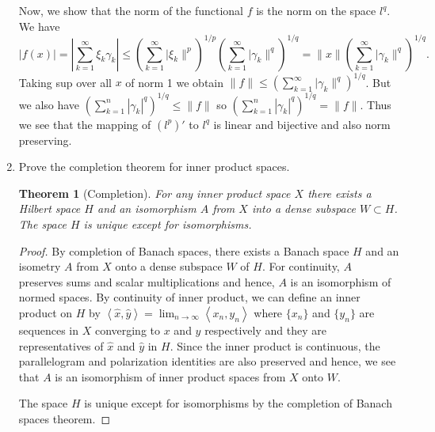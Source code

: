\documentclass[12pt]{article}
\newtheorem{thm}[]{Theorem}
\newcommand{\inn}[2]{\left\langle #1, #2 \right\rangle}
\begin{document}
\begin{enumerate}
\begin{mybox}
    \vspace*{3mm}
    Now, we show that the norm of the functional $f$ is
    the norm on the space $l^q$. We have
    $$|f(x)|=\left|\sum_{k=1}^\infty{\xi_k\gamma_k}
    \right|\leq\left(\sum_{k=1}^\infty{|\xi_k\|^p}
    \right)^{1/p}\left(\sum_{k=1}^\infty{|\gamma_k\|^q}
    \right)^{1/q}=\|x\|\left(\sum_{k=1}^\infty
    {|\gamma_k\|^q}\right)^{1/q}.$$
    Taking sup over all $x$ of norm 1 we obtain $\|f\|
    \leq \left(\sum_{k=1}^\infty
    {|\gamma_k\|^q}\right)^{1/q}$. But we also have 
    $\left(\sum_{k=1}^n{|\gamma_k|^q}\right)^{1/q}
    \leq\|f\|$ so $\left(\sum_{k=1}^n
    {|\gamma_k|^q}\right)^{1/q}=\|f\|$. Thus we see that
    the mapping of $(l^p)'$ to $l^q$ is linear and
    bijective and also norm preserving.
\end{mybox}


\item Prove the completion theorem for inner
product spaces.
\begin{mybox}

    \begin{thm}[Completion]
        For any inner product space $X$ there exists a
        Hilbert space
        $H$ and an isomorphism $A$ from $X$ into a dense
        subspace $W\subset H$. The space $H$
        is unique except for isomorphisms.

    \end{thm}
    \begin{proof}
        By completion of Banach spaces, there exists
        a Banach space $H$ and an isometry $A$ from $X$
        onto a dense subspace $W$ of $H$. For continuity,
        $A$ preserves sums and scalar multiplications and
        hence, $A$ is an isomorphism of normed spaces.
        By continuity of inner product, we can define
        an inner product on $H$ by
        $\inn{\hat{x}}{\hat{y}}=\lim_{n\to\infty}
        {\inn{x_n}{y_n}}$ where $\{x_n\}$ and $\{y_n\}$
        are sequences in $X$ converging to $x$ and
        $y$ respectively and they are representatives of
        $\hat{x}$ and $\hat{y}$ in $H$. Since the inner
        product is continuous, the
        parallelogram and polarization identities are
        also preserved and hence,
        we see that $A$ is an isomorphism of
        inner product spaces from $X$ onto $W$.

        The space $H$ is unique except for isomorphisms
        by the completion of Banach spaces theorem.
    \end{proof}
\end{mybox}
 

\end{enumerate}
\end{document}
